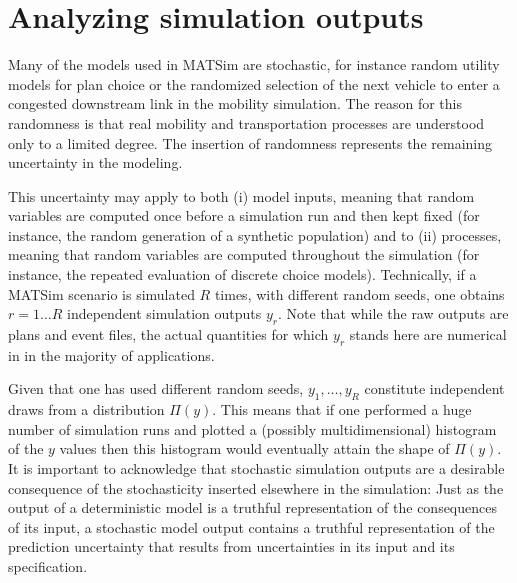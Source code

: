 \section{\label{sec:Statistical-analysis-of}Analyzing simulation outputs}


Many of the models used in MATSim are stochastic, for instance random
utility models for plan choice or the randomized selection of the
next vehicle to enter a congested downstream link in the mobility
simulation. The reason for this randomness is that real mobility and
transportation processes are understood only to a limited degree.
The insertion of randomness represents the remaining uncertainty in
the modeling. 

This uncertainty may apply to both (i) model inputs, meaning that
random variables are computed once before a simulation run and then
kept fixed (for instance, the random generation of a synthetic population)
and to (ii) processes, meaning that random variables are computed
throughout the simulation (for instance, the repeated evaluation of
discrete choice models). Technically, if a MATSim scenario is simulated
$R$ times, with different random seeds, one obtains $r=1\ldots R$
independent simulation outputs $y_{r}$. Note that while the raw outputs
are plans and event files, the actual quantities for which $y_{r}$
stands here are numerical in in the majority of applications.

Given that one has used different random seeds, $y_{1},\ldots,y_{R}$
constitute independent draws from a distribution $\Pi(y)$. This means
that if one performed a huge number of simulation runs and plotted
a (possibly multidimensional) histogram of the $y$ values then this
histogram would eventually attain the shape of $\Pi(y)$. It is important
to acknowledge that stochastic simulation outputs are a desirable
consequence of the stochasticity inserted elsewhere in the simulation:
Just as the output of a deterministic model is a truthful representation
of the consequences of its input, a stochastic model output contains
a truthful representation of the prediction uncertainty that results
from uncertainties in its input and its specification.

